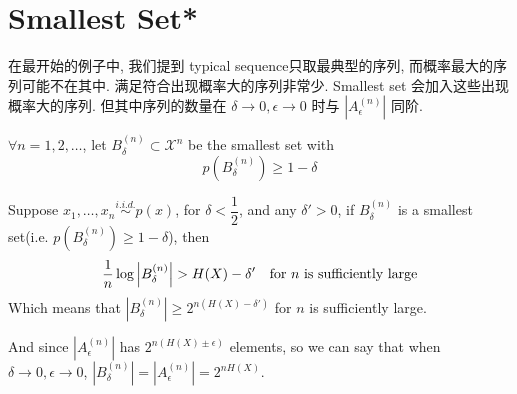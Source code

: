 \section{Smallest Set*}
在最开始的例子中, 我们提到 typical sequence只取最典型的序列, 而概率最大的序列可能不在其中. 满足符合出现概率大的序列非常少. Smallest set 会加入这些出现概率大的序列. 但其中序列的数量在 $\delta\to 0,\epsilon\to 0$ 时与 $\left|A_{\epsilon}^{(n)}\right|$ 同阶.

\begin{definition}
$\forall n=1,2,\ldots$, let $B_{\delta}^{(n)}\subset\mathcal{X}^n$ be the smallest set with
$$p\left(B_{\delta}^{(n)}\right)\geq 1-\delta$$
\end{definition}

\begin{proposition}
Suppose $x_1,\ldots,x_n\stackrel{i.i.d.}{\sim}p(x)$, for $\delta<\dfrac{1}{2}$, and any $\delta'>0$, if $B_{\delta}^{(n)}$ is a smallest set(i.e. $p\left(B_{\delta}^{(n)}\right)\geq 1-\delta$), then
$$\dfrac{1}{n}\log\left|B_{\delta}^{(n)}\right|> H(X)-\delta' \text{\quad for $n$ is sufficiently large}$$
Which means that $\left|B_{\delta}^{(n)}\right|\geq 2^{n(H(X)-\delta')}$ for $n$ is sufficiently large.
\end{proposition}
And since $\left|A_{\epsilon}^{(n)}\right|$ has $2^{n(H(X)\pm\epsilon)}$ elements, so we can say that when $\delta\to 0, \epsilon\to 0$, $\left|B_{\delta}^{(n)}\right|=\left|A_{\epsilon}^{(n)}\right|=2^{nH(X)}$.
